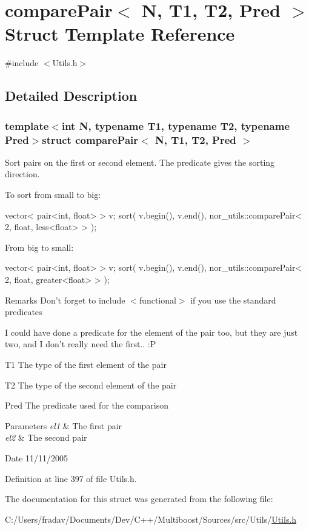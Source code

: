 \hypertarget{structcomparePair}{\section{compare\-Pair$<$ N, T1, T2, Pred $>$ Struct Template Reference}
\label{structcomparePair}
}


{\ttfamily \#include $<$Utils.\-h$>$}



\subsection{Detailed Description}
\subsubsection*{template$<$int N, typename T1, typename T2, typename Pred$>$struct compare\-Pair$<$ N, T1, T2, Pred $>$}

Sort pairs on the first or second element. The predicate gives the sorting direction.

To sort from small to big\-: 
\begin{DoxyCode}
vector< pair<int, float> > v;
sort( v.begin(), v.end(), nor\_utils::comparePair< 2, float, less<float> > );
\end{DoxyCode}
 From big to small\-: 
\begin{DoxyCode}
vector< pair<int, float> > v;
sort( v.begin(), v.end(), nor\_utils::comparePair< 2, float, greater<float> > );
\end{DoxyCode}
 \begin{DoxyRemark}{Remarks}
Don't forget to include $<$functional$>$ if you use the standard predicates 

I could have done a predicate for the element of the pair too, but they are just two, and I don't really need the first.. \-:P 

T1 The type of the first element of the pair 

T2 The type of the second element of the pair 

Pred The predicate used for the comparison 
\end{DoxyRemark}

\begin{DoxyParams}{Parameters}
{\em el1} & The first pair \\
\hline
{\em el2} & The second pair \\
\hline
\end{DoxyParams}
\begin{DoxyDate}{Date}
11/11/2005 
\end{DoxyDate}


Definition at line 397 of file Utils.\-h.



The documentation for this struct was generated from the following file\-:\begin{DoxyCompactItemize}
\item 
C\-:/\-Users/fradav/\-Documents/\-Dev/\-C++/\-Multiboost/\-Sources/src/\-Utils/\hyperlink{Utils_8h}{Utils.\-h}\end{DoxyCompactItemize}

